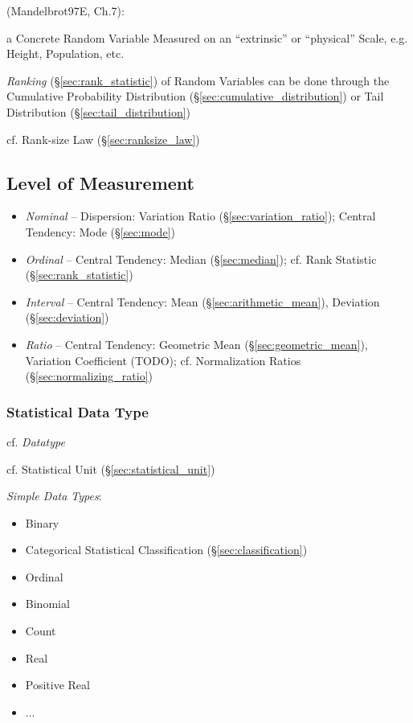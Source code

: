 (Mandelbrot97E, Ch.7):

a Concrete Random Variable Measured on an ``extrinsic'' or ``physical'' Scale,
e.g. Height, Population, etc.

\emph{Ranking} (\S\ref{sec:rank_statistic}) of Random Variables can be done
through the Cumulative Probability Distribution
(\S\ref{sec:cumulative_distribution}) or Tail Distribution
(\S\ref{sec:tail_distribution})

cf. Rank-size Law (\S\ref{sec:ranksize_law})



\subsection{Level of Measurement}\label{sec:measurement_level}

\begin{itemize}
  \item \emph{Nominal} -- Dispersion: Variation Ratio
    (\S\ref{sec:variation_ratio}); Central Tendency: Mode (\S\ref{sec:mode})
  \item \emph{Ordinal} -- Central Tendency: Median (\S\ref{sec:median});
    cf. Rank Statistic (\S\ref{sec:rank_statistic})
  \item \emph{Interval} -- Central Tendency: Mean (\S\ref{sec:arithmetic_mean}),
    Deviation (\S\ref{sec:deviation})
  \item \emph{Ratio} -- Central Tendency: Geometric Mean
    (\S\ref{sec:geometric_mean}), Variation Coefficient (TODO);
    cf. Normalization Ratios (\S\ref{sec:normalizing_ratio})
\end{itemize}



\subsubsection{Statistical Data Type}\label{sec:statistical_data_type}

\fist cf. \emph{Datatype}

cf. Statistical Unit (\S\ref{sec:statistical_unit})

\emph{Simple Data Types}:
\begin{itemize}
  \item Binary
  \item Categorical
    \fist Statistical Classification (\S\ref{sec:classification})
  \item Ordinal
  \item Binomial
  \item Count
  \item Real
  \item Positive Real
  \item ...
\end{itemize}

